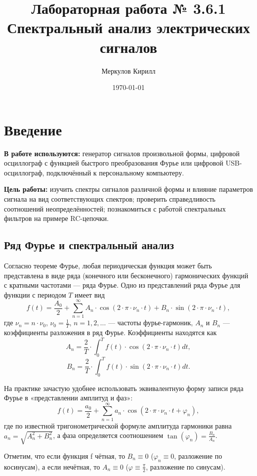 \documentclass[a4paper,12pt]{article}
\title{Лабораторная работа № 3.6.1\\Спектральный анализ электрических сигналов}
\author{Меркулов Кирилл}
\date{\today}
\begin{document}
\maketitle
\newpage

\section*{Введение}

\textbf{В работе используются:} генератор сигналов произвольной формы, цифровой осциллограф с функцией быстрого преобразования Фурье или цифровой USB-осциллограф, подключённый к персональному компьютеру.

\textbf{Цель работы:} изучить спектры сигналов различной формы и влияние параметров сигнала на вид соответствующих спектров; проверить справедливость соотношений неопределённостей; познакомиться с работой спектральных фильтров на примере RC-цепочки.

\subsection*{Ряд Фурье и спектральный анализ}

Согласно теореме Фурье, любая периодическая функция может быть представлена в виде ряда (конечного или бесконечного) гармонических функций с кратными частотами — ряда Фурье. Одно из представлений ряда Фурье для функции с периодом $T$ имеет вид
\[
f(t) = \frac{A_0}{2} + \sum_{n=1}^{\infty}A_n \cdot \cos(2 \cdot \pi \cdot \nu_n \cdot t) + B_n \cdot \sin(2 \cdot \pi \cdot \nu_n \cdot t),
\]
где $\nu_n = n \cdot \nu_0$, $\nu_0 = \frac{1}{T}$, $n = 1,2, \ldots$ — частоты фурье-гармоник, $A_n$ и $B_n$ — коэффициенты разложения в ряд Фурье. Коэффициенты находятся как
\[
A_n = \frac{2}{T} \cdot \int_0^T f(t) \cdot \cos(2 \cdot \pi \cdot \nu_n \cdot t) dt,
\]
\[
B_n = \frac{2}{T} \cdot \int_0^T f(t) \cdot \sin(2 \cdot \pi \cdot \nu_n \cdot t) dt.
\]

На практике зачастую удобнее использовать эквивалентную форму записи ряда Фурье в «представлении амплитуд и фаз»:
\[
f(t) = \frac{a_0}{2} + \sum_{n=1}^{\infty} a_n \cdot \cos(2 \cdot \pi \cdot \nu_n \cdot t + \varphi_n),
\]
где по известной тригонометрической формуле амплитуда гармоники равна $a_n = \sqrt{A_n^2 + B_n^2}$, а фаза определяется соотношением $\tan(\varphi_n) = \frac{B_n}{A_n}$.

Отметим, что если функция f чётная, то $B_n \equiv 0$ ($\varphi_n \equiv 0$, разложение по косинусам), а если нечётная, то $A_n \equiv 0$ ($\varphi \equiv \frac{\pi}{2}$, разложение по синусам).
\end{document}
